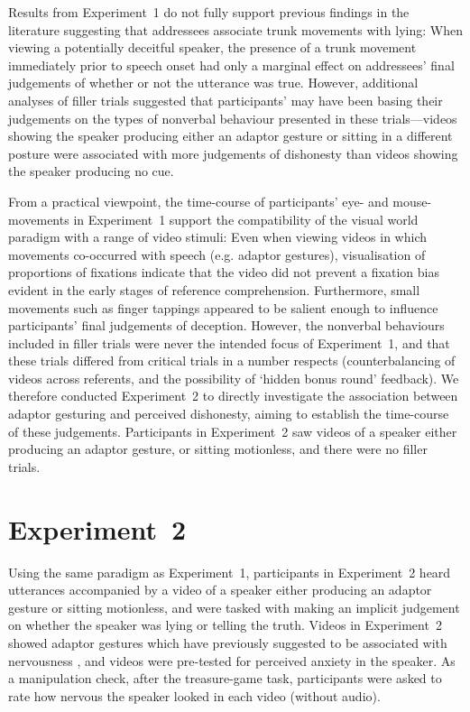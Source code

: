 \documentclass[a4paper,man,natbib]{apa6}
\begin{document}
Results from Experiment~1 do not fully support previous findings in the literature suggesting that addressees associate trunk movements with lying: When viewing a potentially deceitful speaker, the presence of a trunk movement immediately prior to speech onset had only a marginal effect on addressees' final judgements of whether or not the utterance was true.
However, additional analyses of filler trials suggested that participants' may have been basing their judgements on the types of nonverbal behaviour presented in these trials---videos showing the speaker producing either an adaptor gesture or sitting in a different posture were associated with more judgements of dishonesty than videos showing the speaker producing no cue. 

From a practical viewpoint, the time-course of participants' eye- and mouse-movements in Experiment~1 support the compatibility of the visual world paradigm with a range of video stimuli: Even when viewing videos in which movements co-occurred with speech (e.g. adaptor gestures), visualisation of proportions of fixations indicate that the video did not prevent a fixation bias evident in the early stages of reference comprehension.
Furthermore, small movements such as finger tappings appeared to be salient enough to influence participants' final judgements of deception.
However, the nonverbal behaviours included in filler trials were never the intended focus of Experiment~1, and that these trials differed from critical trials in a number respects (counterbalancing of videos across referents, and the possibility of `hidden bonus round' feedback).
We therefore conducted Experiment~2 to directly investigate the association between adaptor gesturing and perceived dishonesty, aiming to establish the time-course of these judgements.
Participants in Experiment~2 saw videos of a speaker either producing an adaptor gesture, or sitting motionless, and there were no filler trials.


\section{Experiment~2}
Using the same paradigm as Experiment~1, participants in Experiment~2 heard utterances accompanied by a video of a speaker either producing an adaptor gesture or sitting motionless, and were tasked with making an implicit judgement on whether the speaker was lying or telling the truth.
Videos in Experiment~2 showed adaptor gestures which have previously suggested to be associated with nervousness \citep[See][]{Gregersen2005}, and videos were pre-tested for perceived anxiety in the speaker.
As a manipulation check, after the treasure-game task, participants were asked to rate how nervous the speaker looked in each video (without audio).
\end{document}
